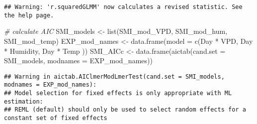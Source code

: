 \documentclass[
]{article}
\newenvironment{Shaded}{\begin{snugshade}}{\end{snugshade}}
\newcommand{\AttributeTok}[1]{\textcolor[rgb]{0.77,0.63,0.00}{#1}}
\newcommand{\CommentTok}[1]{\textcolor[rgb]{0.56,0.35,0.01}{\textit{#1}}}
\newcommand{\FunctionTok}[1]{\textcolor[rgb]{0.00,0.00,0.00}{#1}}
\newcommand{\NormalTok}[1]{#1}
\newcommand{\OtherTok}[1]{\textcolor[rgb]{0.56,0.35,0.01}{#1}}
\newcommand{\StringTok}[1]{\textcolor[rgb]{0.31,0.60,0.02}{#1}}
\begin{document}
\begin{verbatim}
## Warning: 'r.squaredGLMM' now calculates a revised statistic. See the help page.
\end{verbatim}

\begin{Shaded}
\begin{Highlighting}[]
\CommentTok{\# calculate AIC}
\NormalTok{SMI\_models }\OtherTok{\textless{}{-}} \FunctionTok{list}\NormalTok{(SMI\_mod\_VPD, SMI\_mod\_hum, SMI\_mod\_temp)}
\NormalTok{EXP\_mod\_names }\OtherTok{\textless{}{-}} \FunctionTok{data.frame}\NormalTok{(}\AttributeTok{model =} 
                               \FunctionTok{c}\NormalTok{(}\StringTok{\textquotesingle{}Day * VPD\textquotesingle{}}\NormalTok{,}
                                 \StringTok{\textquotesingle{}Day * Humidity\textquotesingle{}}\NormalTok{,}
                                 \StringTok{\textquotesingle{}Day * Temp\textquotesingle{}}
\NormalTok{                                 ))}
\NormalTok{SMI\_AICc }\OtherTok{\textless{}{-}} \FunctionTok{data.frame}\NormalTok{(}\FunctionTok{aictab}\NormalTok{(}\AttributeTok{cand.set =}\NormalTok{ SMI\_models, }
                                 \AttributeTok{modnames =}\NormalTok{ EXP\_mod\_names))}
\end{Highlighting}
\end{Shaded}

\begin{verbatim}
## Warning in aictab.AIClmerModLmerTest(cand.set = SMI_models, modnames = EXP_mod_names): 
## Model selection for fixed effects is only appropriate with ML estimation:
## REML (default) should only be used to select random effects for a constant set of fixed effects
\end{verbatim}
\end{document}
